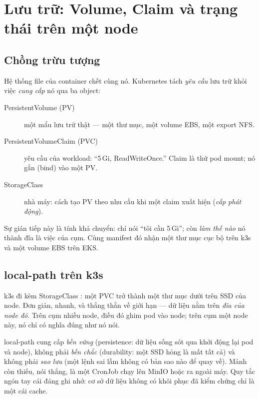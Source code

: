 \chapter{Lưu trữ: Volume, Claim và trạng thái trên một node}
\label{ch:storage}

\section{Chồng trừu tượng}

Hệ thống file của container chết cùng nó. Kubernetes tách \emph{yêu
cầu} lưu trữ khỏi việc \emph{cung cấp} nó qua ba object:

\begin{description}
  \item[PersistentVolume (PV)] một mẩu lưu trữ thật --- một thư mục,
  một volume EBS, một export NFS.
  \item[PersistentVolumeClaim (PVC)] yêu cầu của workload: ``5\,Gi,
  ReadWriteOnce.'' Claim là thứ pod mount; nó gắn (bind) vào một PV.
  \item[StorageClass] nhà máy: cách tạo PV theo nhu cầu khi một claim
  xuất hiện (\emph{cấp phát động}).
\end{description}

Sự gián tiếp này là tính khả chuyển:  chỉ
nói ``tôi cần 5\,Gi''; còn \emph{làm thế nào} nó thành đĩa là việc của
cụm. Cùng manifest đó nhận một thư mục cục bộ trên k3s và một volume
EBS trên EKS.

\section{local-path trên k3s}

k3s đi kèm StorageClass : một PVC trở thành một thư mục
dưới  trên SSD của node. Đơn giản,
nhanh, và thẳng thắn về giới hạn --- dữ liệu nằm trên \emph{đĩa của node
đó}. Trên cụm nhiều node, điều đó ghim pod vào node; trên cụm một node
này, nó chỉ có nghĩa đúng như nó nói.

\begin{hardware}
local-path cung cấp \emph{bền vững} (persistence: dữ liệu sống sót qua
khởi động lại pod và node), không phải \emph{bền chắc} (durability: một
SSD hỏng là mất tất cả) và không phải \emph{sao lưu} (một lệnh
 sai lầm không có bản sao nào để quay về).
Mảnh còn thiếu, nói thẳng, là một CronJob chạy  lên MinIO
hoặc ra ngoài máy. Quy tắc ngón tay cái đáng ghi nhớ: cơ sở dữ liệu
không có khôi phục đã kiểm chứng chỉ là một cái cache.
\end{hardware}

